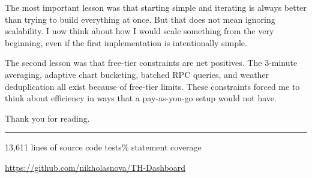 \documentclass[11pt, letterpaper]{article}
\begin{document}
The most important lesson was that starting simple and iterating is always better than trying to build everything at once. But that does not mean ignoring scalability. I now think about how I would scale something from the very beginning, even if the first implementation is intentionally simple.

The second lesson was that free-tier constraints are net positives. The 3-minute averaging, adaptive chart bucketing, batched RPC queries, and weather deduplication all exist because of free-tier limits. These constraints forced me to think about efficiency in ways that a pay-as-you-go setup would not have.

Thank you for reading.

\vspace{2em}
\begin{center}
{\color{sectionrule}\rule{0.4\textwidth}{0.5pt}}

\vspace{1em}
{\small\sffamily\color{titlegray} 13,611 lines of source code\enspace\textbullet{} tests\enspace\textbullet{}\% statement coverage}

\vspace{0.3em}
{\small\sffamily\color{titlegray}\url{https://github.com/nikholasnova/TH-Dashboard}}
\end{center}
\end{document}
